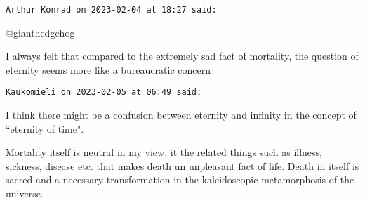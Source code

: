 \begin{footnotesize}
\begin{sffamily}
\hfill

\texttt{Arthur Konrad on 2023-02-04 at 18:27 said: }

@gianthedgehog 

I always felt that compared to the extremely sad fact of mortality, the question of eternity seems more like a bureaucratic concern


\hfill

\texttt{Kaukomieli on 2023-02-05 at 06:49 said: }

I think there might be a confusion between eternity and infinity in the concept of ``eternity of time".

Mortality itself is neutral in my view, it the related things such as illness, sickness, disease etc. that makes death un unpleasant fact of life. Death in itself is sacred and a necessary transformation in the kaleidoscopic metamorphosis of the universe.


\end{sffamily}\end{footnotesize}

